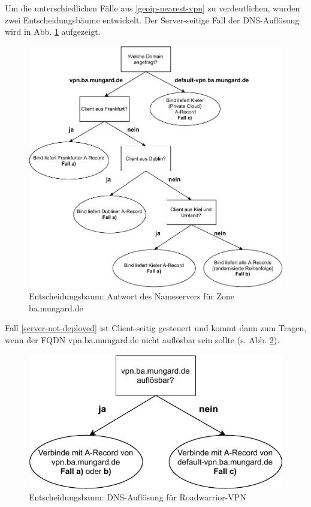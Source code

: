 Um die unterschiedlichen Fälle aus \ref{geoip-nearest-vpn} zu verdeutlichen, wurden zwei Entscheidungsbäume entwickelt. Der Server-seitige Fall der \gls{DNS}-Auflösung wird in Abb. \ref{grafik:Use-Case_2_Entscheidungsbaum_GeoIP} aufgezeigt.
\begin{figure}[h]
  \centering
  \includegraphics{Figures/entscheidungsbaum_bind_geoip.pdf}
  \caption{Entscheidungsbaum: Antwort des Nameservers für Zone ba.mungard.de}
  \label{grafik:Use-Case_2_Entscheidungsbaum_GeoIP}
\end{figure}\FloatBarrier

Fall \ref{server-not-deployed} ist \gls{Client}-seitig gesteuert und kommt dann zum Tragen, wenn der \gls{FQDN} vpn.ba.mun\-gard.\-de nicht auflösbar sein sollte (s. Abb. \ref{grafik:Use-Case_2_Entscheidungsbaum_OpenVPN}).

\begin{figure}[h]
  \centering
  \includegraphics{Figures/entscheidungsbaum_openvpn_config.pdf}
  \caption{Entscheidungsbaum: DNS-Auflösung für Roadwarrior-VPN}
  \label{grafik:Use-Case_2_Entscheidungsbaum_OpenVPN}
\end{figure}\FloatBarrier

